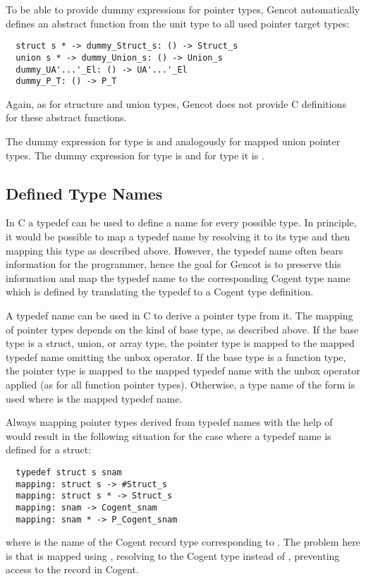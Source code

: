 To be able to provide dummy expressions for pointer types, Gencot automatically defines an 
abstract function from the unit type to all used pointer target types:
\begin{verbatim}
  struct s * -> dummy_Struct_s: () -> Struct_s
  union s * -> dummy_Union_s: () -> Union_s
  dummy_UA'...'_El: () -> UA'...'_El
  dummy_P_T: () -> P_T
\end{verbatim}
Again, as for structure and union types, Gencot does not 
provide C definitions for these abstract functions.

The dummy expression for type  is  and analogously
for mapped union pointer types. The dummy expression for type  is 
 and for type  it is .

\subsection{Defined Type Names}
\label{design-types-typedef}

In C a typedef can be used to define a name for every possible type. In principle, it would be possible to
map a typedef name by resolving it to its type and then mapping this type as described above. However, the
typedef name often bears information for the programmer, hence the goal for Gencot is to preserve this information
and map the typedef name to the corresponding Cogent type name which is defined by translating the typedef
to a Cogent type definition.

A typedef name can be used in C to derive a pointer type from it. The mapping of pointer types depends on 
the kind of base type, as described above. If the base type is a struct, union, or array type, 
the pointer type is mapped to the mapped typedef name omitting the unbox operator. If the base type is a function type,
the pointer type is mapped to the mapped typedef name with the unbox 
operator applied (as for all function pointer types). Otherwise, a type name of the form 
 is used where  is the mapped typedef name.

Always mapping pointer types derived from typedef names with the help of  would result in
the following situation for the case where a typedef name is defined for a struct:
\begin{verbatim}
  typedef struct s snam
  mapping: struct s -> #Struct_s
  mapping: struct s * -> Struct_s
  mapping: snam -> Cogent_snam
  mapping: snam * -> P_Cogent_snam
\end{verbatim}
where  is the name of the Cogent record type corresponding to . The problem here
is that  is mapped using , resolving to the Cogent type 
instead of , preventing access to the record in Cogent.

